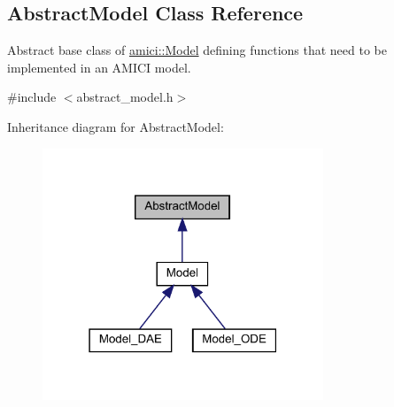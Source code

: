 \hypertarget{classamici_1_1_abstract_model}{}\subsection{Abstract\+Model Class Reference}
\label{classamici_1_1_abstract_model}


Abstract base class of \mbox{\hyperlink{classamici_1_1_model}{amici\+::\+Model}} defining functions that need to be implemented in an A\+M\+I\+CI model.  




{\ttfamily \#include $<$abstract\+\_\+model.\+h$>$}



Inheritance diagram for Abstract\+Model\+:
\nopagebreak
\begin{figure}[H]
\begin{center}
\leavevmode
\includegraphics[width=238pt]{classamici_1_1_abstract_model__inherit__graph}
\end{center}
\end{figure}

